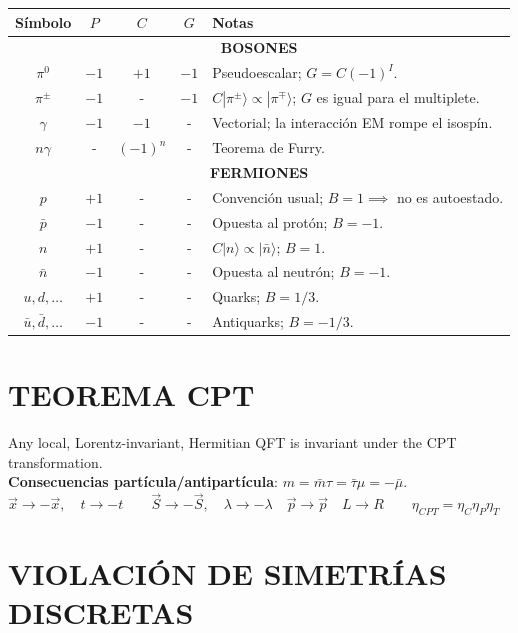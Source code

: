 \begin{center}
\begin{tabular}{|c|c|c|c|l|}
\hline
\textbf{Símbolo} & $P$ & $C$ & $G$ & \textbf{Notas} \\ \hline
\multicolumn{5}{|c|}{\textbf{BOSONES}} \\ \hline
$\pi^0$ & $-1$ & $+1$ & $-1$ & Pseudoescalar; $G = C(-1)^I$. \\ \hline
$\pi^\pm$ & $-1$ & - & $-1$ & $C|\pi^\pm\rangle \propto |\pi^\mp\rangle$; $G$ es igual para el multiplete. \\ \hline
$\gamma$ & $-1$ & $-1$ & - & Vectorial; la interacción EM rompe el isospín. \\ \hline
$n\gamma$ & - & $(-1)^n$ & - & Teorema de Furry. \\ \hline
\multicolumn{5}{|c|}{\textbf{FERMIONES}} \\ \hline
$p$ & $+1$ & - & - & Convención usual; $B = 1 \implies$ no es autoestado. \\ \hline
$\bar{p}$ & $-1$ & - & - & Opuesta al protón; $B = -1$. \\ \hline
$n$ & $+1$ & - & - & $C|n\rangle \propto |\bar{n}\rangle$; $B = 1$. \\ \hline
$\bar{n}$ & $-1$ & - & - & Opuesta al neutrón; $B = -1$. \\ \hline
$u, d, \dots$ & $+1$ & - & - & Quarks; $B = 1/3$. \\ \hline
$\bar{u}, \bar{d}, \dots$ & $-1$ & - & - & Antiquarks; $B = -1/3$. \\ \hline
\end{tabular}
\end{center}

\section{TEOREMA CPT}
Any local, Lorentz-invariant, Hermitian QFT is invariant under the CPT transformation.\\
\textbf{Consecuencias partícula/antipartícula}: $m = \bar{m}$\quad $\tau = \bar{\tau}$\quad $\mu = -\bar{\mu}$.
 $\vec{x} \to -\vec{x},  \quad t \to -t\quad \quad \vec{S} \to -\vec{S}, \quad \lambda \to -\lambda \quad \vec{p} \to \vec{p} \quad L \to R \qquad \eta_{CPT} = \eta_C \eta_P \eta_T$
\section{VIOLACIÓN DE SIMETRÍAS DISCRETAS}

